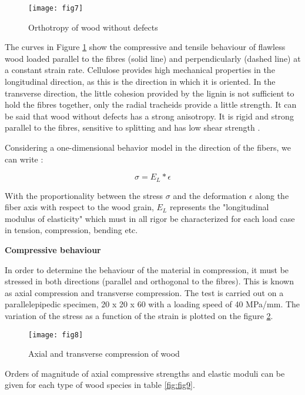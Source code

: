 \begin{figure}[htp]
	\centering
	\texttt{[image: fig7]}
	\caption{Orthotropy of wood without defects \cite{Taazount2021}}
	\label{fig:fig7}
\end{figure}

The curves in Figure \ref{fig:fig7} show the compressive and tensile behaviour of flawless wood loaded parallel to the fibres (solid line) and perpendicularly (dashed line) at a constant strain rate. Cellulose provides high mechanical properties in the longitudinal direction, as this is the direction in which it is oriented. In the transverse direction, the little cohesion provided by the lignin is not sufficient to hold the fibres together, only the radial tracheids provide a little strength. It can be said that wood without defects has a strong anisotropy. It is rigid and strong parallel to the fibres, sensitive to splitting and has low shear strength \cite{Taazount2021}.

Considering a one-dimensional behavior model in the direction of the fibers, we can write :

\begin{equation}
	\sigma = E_{L}*\epsilon
\end{equation}

With the proportionality between the stress $\sigma$ and the deformation $\epsilon$ along the fiber axis with respect to the wood grain, $ E_L $ represents the "longitudinal modulus of elasticity" which must in all rigor be characterized for each load case in tension, compression, bending etc.


\textbf{Compressive behaviour}

In order to determine the behaviour of the material in compression, it must be stressed in both directions (parallel and orthogonal to the fibres). This is known as axial compression and transverse compression. The test is carried out on a parallelepipedic specimen, 20 x 20 x 60  with a loading speed of 40 MPa/mm. The variation of the stress as a function of the strain is plotted on the figure \ref{fig:fig8}.


\begin{figure}[htp]
	\centering
	\texttt{[image: fig8]}
	\caption{Axial and transverse compression of wood}
	\label{fig:fig8}
\end{figure}

Orders of magnitude of axial compressive strengths and elastic moduli can be given for each type of wood species in table \ref{fig:fig9}. 

